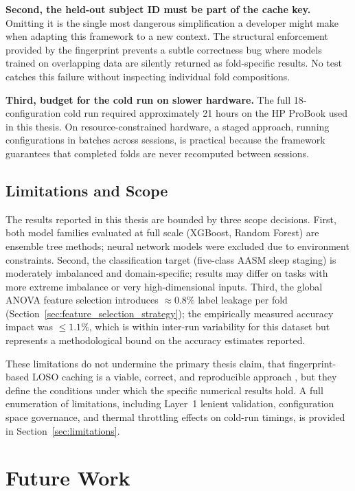 \textbf{Second, the held-out subject ID must be part of the cache key.}
Omitting it is the single most dangerous simplification a developer might make
when adapting this framework to a new context. The structural enforcement
provided by the fingerprint prevents a subtle correctness bug where models
trained on overlapping data are silently returned as fold-specific results.
No test catches this failure without inspecting individual fold compositions.

\textbf{Third, budget for the cold run on slower hardware.}
The full 18-configuration cold run required approximately 21 hours on the
HP ProBook used in this thesis. On resource-constrained hardware, a staged
approach, running configurations in batches across sessions, is practical
because the framework guarantees that completed folds are never recomputed
between sessions.

\subsection{Limitations and Scope}

The results reported in this thesis are bounded by three scope decisions.
First, both model families evaluated at full scale (XGBoost, Random Forest)
are ensemble tree methods; neural network models were excluded due to
environment constraints. Second, the classification target (five-class AASM
sleep staging) is moderately imbalanced and domain-specific; results may differ
on tasks with more extreme imbalance or very high-dimensional inputs.
Third, the global ANOVA feature selection introduces $\approx 0.8\%$ label
leakage per fold (Section~\ref{sec:feature_selection_strategy}); the
empirically measured accuracy impact was $\leq 1.1\%$, which is within
inter-run variability for this dataset but represents a methodological bound
on the accuracy estimates reported.

These limitations do not undermine the primary thesis claim, that
fingerprint-based LOSO caching is a viable, correct, and reproducible approach
, but they define the conditions under which the specific numerical results
hold. A full enumeration of limitations, including Layer~1 lenient validation,
configuration space governance, and thermal throttling effects on cold-run
timings, is provided in Section~\ref{sec:limitations}.


\section{Future Work}

